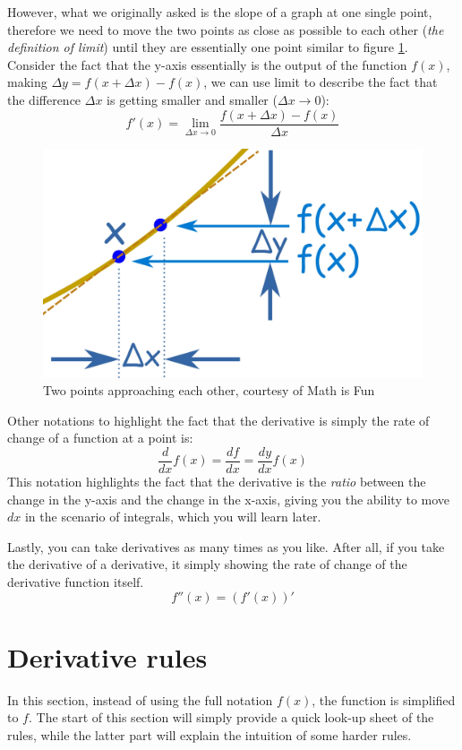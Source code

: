 However, what we originally asked is the slope of a graph at one single point, therefore we need to move the two points as close as possible to each other (\textit{the definition of limit}) until they are essentially one point similar to figure \ref{fig:m10}. Consider the fact that the y-axis essentially is the output of the function $f(x)$, making $\Delta y=f(x+\Delta x)-f(x)$, we can use limit to describe the fact that the difference $\Delta x$ is getting smaller and smaller ($\Delta x\to0$):
\begin{equation}
    \label{eq:m3}
    f'(x)
    = \lim_{\Delta x\to 0} \frac
        {f(x+\Delta x)-f(x)}
        {\Delta x}
\end{equation}
\begin{figure}
    \centering
    \includegraphics[width=0.5\linewidth]{math/10.png}
    \caption{Two points approaching each other, courtesy of Math is Fun}
    \label{fig:m10}
\end{figure}

Other notations to highlight the fact that the derivative is simply the rate of change of a function at a point is:
\begin{equation}
    \frac{d}{dx}f(x) = \frac{df}{dx} = \frac{dy}{dx}f(x)
\end{equation}
This notation highlights the fact that the derivative is the \textit{ratio} between the change in the y-axis and the change in the x-axis, giving you the ability to move $dx$ in the scenario of integrals, which you will learn later.

Lastly, you can take derivatives as many times as you like. After all, if you take the derivative of a derivative, it simply showing the rate of change of the derivative function itself.
\begin{equation}
    f''(x)=(f'(x))'
\end{equation}

\section{Derivative rules}
In this section, instead of using the full notation $f(x)$, the function is simplified to $f$. The start of this section will simply provide a quick look-up sheet of the rules, while the latter part will explain the intuition of some harder rules. 

